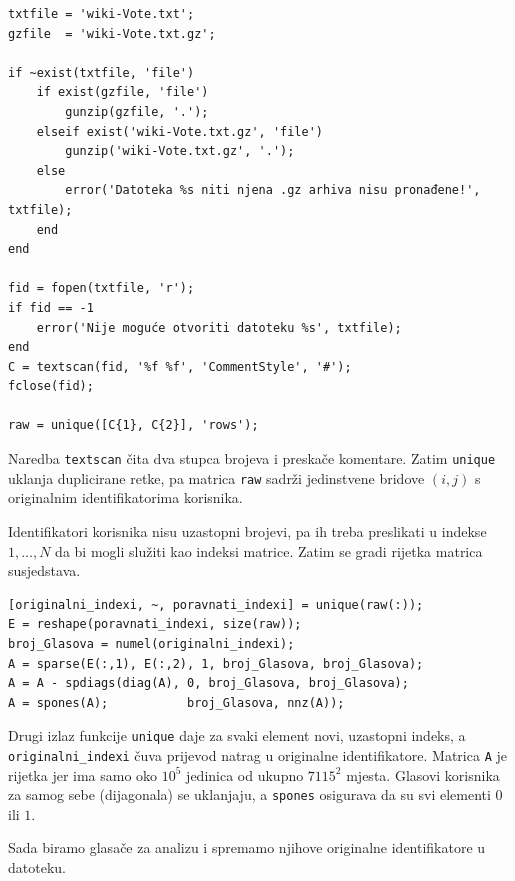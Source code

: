 \documentclass[12pt, letterpaper]{article}
\numberwithin{figure}{section}
\begin{document}
\begin{lstlisting}[style=octave, caption={Učitavanje podataka}, label={lst:wiki_ucitavanje}]
txtfile = 'wiki-Vote.txt';
gzfile  = 'wiki-Vote.txt.gz'; 

if ~exist(txtfile, 'file')
    if exist(gzfile, 'file')
        gunzip(gzfile, '.');
    elseif exist('wiki-Vote.txt.gz', 'file')
        gunzip('wiki-Vote.txt.gz', '.');
    else
        error('Datoteka %s niti njena .gz arhiva nisu pronađene!', txtfile);
    end
end

fid = fopen(txtfile, 'r');
if fid == -1
    error('Nije moguće otvoriti datoteku %s', txtfile);
end
C = textscan(fid, '%f %f', 'CommentStyle', '#');
fclose(fid);

raw = unique([C{1}, C{2}], 'rows');         
\end{lstlisting}
Naredba \texttt{textscan} čita dva stupca brojeva i preskače komentare. Zatim \texttt{unique} uklanja duplicirane retke, pa matrica \texttt{raw} sadrži jedinstvene bridove $(i,j)$ s originalnim identifikatorima korisnika.

Identifikatori korisnika nisu uzastopni brojevi, pa ih treba preslikati u indekse $1,\dots,N$ da bi mogli služiti kao indeksi matrice. Zatim se gradi rijetka matrica susjedstava.

\begin{lstlisting}[style=octave, caption={Izgradnja matrice susjedstava}, label={lst:wiki_matrica}]
[originalni_indexi, ~, poravnati_indexi] = unique(raw(:));         
E = reshape(poravnati_indexi, size(raw));
broj_Glasova = numel(originalni_indexi);
A = sparse(E(:,1), E(:,2), 1, broj_Glasova, broj_Glasova);         
A = A - spdiags(diag(A), 0, broj_Glasova, broj_Glasova);          
A = spones(A);           broj_Glasova, nnz(A));
\end{lstlisting}
Drugi izlaz funkcije \texttt{unique} daje za svaki element novi, uzastopni indeks, a \texttt{originalni\_indexi} čuva prijevod natrag u originalne identifikatore. Matrica \texttt{A} je rijetka jer ima samo oko $10^5$ jedinica od ukupno $7115^2$ mjesta. Glasovi korisnika za samog sebe (dijagonala) se uklanjaju, a \texttt{spones} osigurava da su svi elementi $0$ ili $1$.

Sada biramo glasače za analizu i spremamo njihove originalne identifikatore u datoteku.
\end{document}
